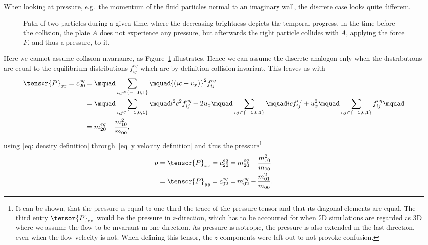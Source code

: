 When looking at pressure, e.g.\ the momentum of the fluid particles normal to an imaginary wall, the discrete case looks quite different.
\begin{figure}
\centering

\caption{Path of two particles during a given time, where the decreasing brightness depicts the temporal progress. In the time before the collision, the plate $A$ does not experience any pressure, but afterwards the right particle collides with $A$, applying the force $F$, and thus a pressure, to it.}
\label{fig: billard table}
\end{figure}
Here we cannot assume collision invariance, as Figure~\ref{fig: billard table} illustrates.
Hence we can assume the discrete analogon only when the distributions are equal to the equilibrium distributions $f_{ij}^{eq}$ which are by definition collision invariant.
This leaves us with
\begin{equation}
  \begin{aligned}
    \tensor{P}_{xx} = c_{20}^{eq}
    & = \mquad\sum_{i,j \in \{-1,0,1\}}\mquad  {(ic - u_x)}^2 f_{ij}^{eq}
    \\ & =
    \mquad\sum_{i,j \in \{-1,0,1\}}\mquad  i^2 c^2 f_{ij}^{eq} - 2 u_x \mquad \sum_{i,j \in \{-1,0,1\}}\mquad  ic f_{ij}^{eq} + u_x^2 \mquad\sum_{i,j \in \{-1,0,1\}} f_{ij}^{eq}\mquad
    \\ & = m_{20}^{eq} - \frac{m_{10}^2}{m_{00}},
  \end{aligned}
\end{equation}
using~\eqref{eq: density definition} through~\eqref{eq: y velocity definition} and thus the pressure\footnote{It can be shown, that the pressure is equal to one third the trace of the pressure tensor and that its diagonal elements are equal.
The third entry $\tensor{P}_{zz}$ would be the pressure in $z$-direction, which has to be accounted for when 2D simulations are regarded as 3D where we assume the flow to be invariant in one direction.
As pressure is isotropic, the pressure is also extended in the last direction, even when the flow velocity is not. When defining this tensor, the $z$-components were left out to not provoke confusion.}
\begin{equation}
  \label{eq: pressure}
  \begin{aligned}
    p &= \tensor{P}_{xx} =c_{20}^{eq}= m_{20}^{eq} - \frac{m_{10}^2}{m_{00}}\\
     &= \tensor{P}_{yy} =c_{02}^{eq} = m_{02}^{eq} - \frac{m_{01}^2}{m_{00}}.
  \end{aligned}
\end{equation}

